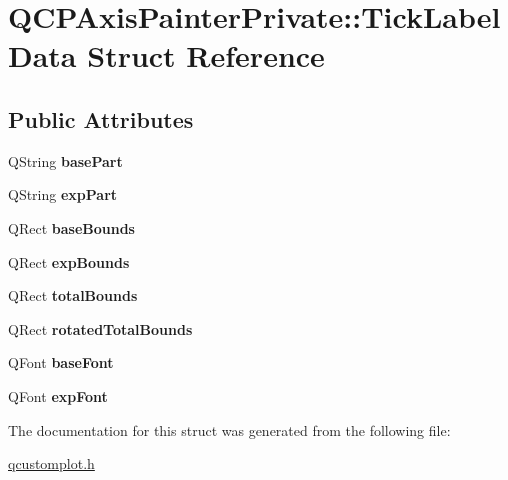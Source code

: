 \hypertarget{structQCPAxisPainterPrivate_1_1TickLabelData}{}\section{Q\+C\+P\+Axis\+Painter\+Private\+:\+:Tick\+Label\+Data Struct Reference}
\label{structQCPAxisPainterPrivate_1_1TickLabelData}
\subsection*{Public Attributes}
\begin{DoxyCompactItemize}
\item 
\hypertarget{structQCPAxisPainterPrivate_1_1TickLabelData_ad65b76a5cafc412179a20b5d79809fc4}{}Q\+String {\bfseries base\+Part}\label{structQCPAxisPainterPrivate_1_1TickLabelData_ad65b76a5cafc412179a20b5d79809fc4}

\item 
\hypertarget{structQCPAxisPainterPrivate_1_1TickLabelData_a09692e4ea092137278b4ac051d5fdf2b}{}Q\+String {\bfseries exp\+Part}\label{structQCPAxisPainterPrivate_1_1TickLabelData_a09692e4ea092137278b4ac051d5fdf2b}

\item 
\hypertarget{structQCPAxisPainterPrivate_1_1TickLabelData_aac1047ae6ab8e9f5a42923082aabfff5}{}Q\+Rect {\bfseries base\+Bounds}\label{structQCPAxisPainterPrivate_1_1TickLabelData_aac1047ae6ab8e9f5a42923082aabfff5}

\item 
\hypertarget{structQCPAxisPainterPrivate_1_1TickLabelData_a6722d2bcefb93011e9dc42301b966846}{}Q\+Rect {\bfseries exp\+Bounds}\label{structQCPAxisPainterPrivate_1_1TickLabelData_a6722d2bcefb93011e9dc42301b966846}

\item 
\hypertarget{structQCPAxisPainterPrivate_1_1TickLabelData_afbb3163cf4c628914f1b703945419ea5}{}Q\+Rect {\bfseries total\+Bounds}\label{structQCPAxisPainterPrivate_1_1TickLabelData_afbb3163cf4c628914f1b703945419ea5}

\item 
\hypertarget{structQCPAxisPainterPrivate_1_1TickLabelData_aa4d38c5ea47c9184a78ee33ae7f1012e}{}Q\+Rect {\bfseries rotated\+Total\+Bounds}\label{structQCPAxisPainterPrivate_1_1TickLabelData_aa4d38c5ea47c9184a78ee33ae7f1012e}

\item 
\hypertarget{structQCPAxisPainterPrivate_1_1TickLabelData_a0d4958a706debaa8d19a9b65fc090d56}{}Q\+Font {\bfseries base\+Font}\label{structQCPAxisPainterPrivate_1_1TickLabelData_a0d4958a706debaa8d19a9b65fc090d56}

\item 
\hypertarget{structQCPAxisPainterPrivate_1_1TickLabelData_adc10767ebcb719d6927c012a38b9d933}{}Q\+Font {\bfseries exp\+Font}\label{structQCPAxisPainterPrivate_1_1TickLabelData_adc10767ebcb719d6927c012a38b9d933}

\end{DoxyCompactItemize}


The documentation for this struct was generated from the following file\+:\begin{DoxyCompactItemize}
\item 
\hyperlink{qcustomplot_8h}{qcustomplot.\+h}\end{DoxyCompactItemize}
